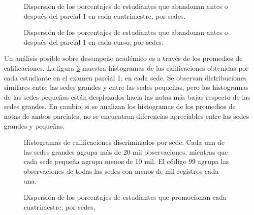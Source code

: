 \documentclass[a4paper,11pt,dvipsnames]{article}
\begin{document}
\begin{figure}[!t]
    \begin{center}
        
    \end{center}
    \caption{Dispersión de los porcentajes de estudiantes que abandonan antes o después del parcial 1 en cada cuatrimestre, por sedes.}
    \label{fig:box-cuat}
\end{figure}

\begin{figure}[!h]
    \begin{center}
        
    \end{center}
    \caption{Dispersión de los porcentajes de estudiantes que abandonan antes o después del parcial 1 en cada curso, por sedes.}
    \label{fig:box-curso}
\end{figure}\clearpage

Un análisis posible sobre desempeño académico es a través de los promedios de calificaciones. La figura \ref{fig:hist-pa1} muestra histogramas de las calificaciones obtenidas por cada estudiante en el examen parcial 1, en cada sede. Se observan distribuciones similares entre las sedes grandes y entre las sedes pequeñas, pero los histogramas de las sedes pequeñas están desplazados hacia las notas más bajas respecto de las sedes grandes. En cambio, si se analizan los histogramas de los promedios de notas de ambos parciales, no se encuentran diferencias apreciables entre las sedes grandes y pequeñas.\par\medskip
\par\medskip

\begin{figure}[!hb]
    \begin{center}
        
    \end{center}
    \caption{Histogramas de calificaciones discriminados por sede. Cada una de las sedes grandes agrupa más de 20 mil observaciones, mientras que cada sede pequeña agrupa menos de 10 mil. El código 99 agrupa las observaciones de todas las sedes con menos de mil registros cada una.}
    \label{fig:hist-pa1}
\end{figure}

\begin{figure}[!ht]
    \begin{center}
        
    \end{center}
    \caption{Dispersión de los porcentajes de estudiantes que promocionan cada cuatrimestre, por sedes.}
    \label{fig:box-promo}
\end{figure}
\end{document}

